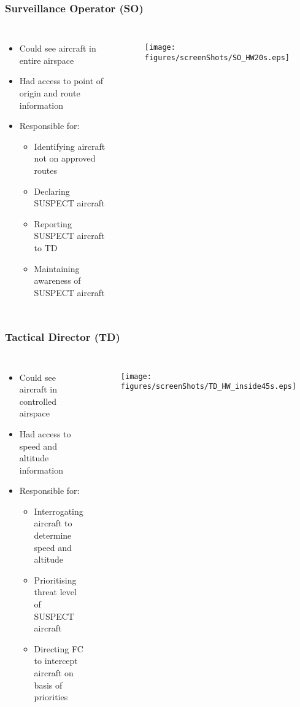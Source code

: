 \documentclass[aspectratio=43, notes]{beamer}
\begin{document}
\begin{frame}
\frametitle{Surveillance Operator (SO)}
\small
\begin{columns}
\begin{itemize}[label=$\bullet$]
	\item Could see aircraft in entire airspace
	\item Had access to point of origin and route information
	\item Responsible for: 
	\begin{itemize} [label=$\bullet$]
		\item Identifying aircraft not on approved routes
		\item Declaring SUSPECT aircraft
		\item Reporting SUSPECT aircraft to TD
		\item Maintaining awareness  of SUSPECT aircraft
	\end{itemize}
\end{itemize}
\begin{figure}[h]
	\begin{center}
		\texttt{[image: figures/screenShots/SO\_HW20s.eps]}
	\end{center}
\end{figure}
\end{columns}
\end{frame}


\begin{frame}
\frametitle{Tactical Director (TD)}
\small
\begin{columns}
\begin{itemize}[label=$\bullet$]
	\item Could see aircraft in controlled airspace
	\item Had access to speed and altitude information
	\item Responsible for:
	\begin{itemize}[label=$\bullet$]
		\item Interrogating aircraft to determine speed and altitude
		\item Prioritising threat level of SUSPECT aircraft
		\item Directing FC to intercept aircraft on basis of priorities
	\end{itemize} 
\end{itemize}
\begin{figure}[h]
	\begin{center}
		\texttt{[image: figures/screenShots/TD\_HW\_inside45s.eps]}\\
	\end{center}
\end{figure}
\end{columns}
\end{frame}
\end{document}
